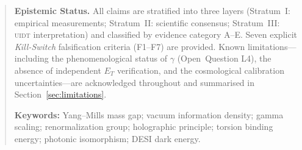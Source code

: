 \begin{abstract}
\medskip\noindent
\textbf{Epistemic Status.}
All claims are stratified into three layers (Stratum~I: empirical
measurements; Stratum~II: scientific consensus; Stratum~III: \textsc{uidt}
interpretation) and classified by evidence category A--E. Seven explicit
\emph{Kill-Switch} falsification criteria (F1--F7) are provided.
Known limitations---including the phenomenological status of $\gamma$
(Open~Question L4), the absence of independent $E_T$ verification, and
the cosmological calibration uncertainties---are acknowledged throughout
and summarised in Section~\ref{sec:limitations}.

\medskip\noindent
\textbf{Keywords:}
Yang--Mills mass gap; vacuum information density; gamma scaling;
renormalization group; holographic principle; torsion binding energy;
photonic isomorphism; DESI dark energy.
\end{abstract}
